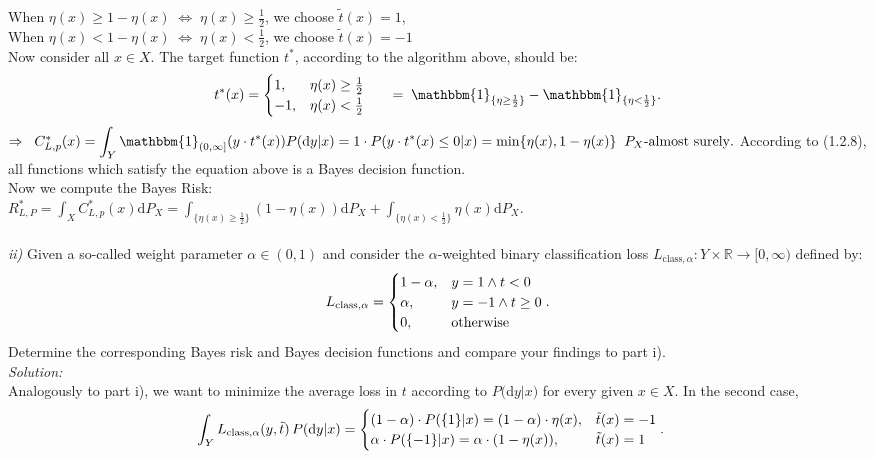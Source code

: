 \documentclass{article}
\begin{document}
When $\eta(x) \geq 1-\eta(x) \; \Leftrightarrow \; \eta(x) \geq \frac{1}{2}$, we choose $\tilde{t}(x) = 1$,\\
When $\eta(x) < 1-\eta(x) \;\Leftrightarrow\; \eta(x) < \frac{1}{2}$, we choose $\tilde{t}(x) = -1$\\
Now consider all $x\in X$. The target function $t^*$, according to the algorithm above, should be:
\begin{align*}
t^*(x) = \begin{cases} 1, &\eta(x) \geq \frac{1}{2} \cr -1, &\eta(x) < \frac{1}{2} \end{cases} 
\indent = \; \mathbbm{1}_{\{\eta \geq \frac{1}{2}\}} - \mathbbm{1}_{\{\eta < \frac{1}{2}\}}.
\end{align*}
$\Rightarrow \;\; C^*_{L,p}(x) = \displaystyle{ \int_{Y} \mathbbm{1}_{(0,\infty]}(y\cdot t^*(x)) P(\text{d}y|x)} =  1 \cdot P(y\cdot t^*(x) \leq 0 | x) = \min \{ \eta(x), 1-\eta(x) \}\;\; P_X\text{-almost surely}.$
According to (1.2.8), all functions which satisfy the equation above is a Bayes decision function.\\
Now we compute the Bayes Risk:\\
$R^*_{L,P} =  \displaystyle{ \int_{X} C^*_{L,p}(x) \text{d}P_X = \int_{\{\eta(x)\geq \frac{1}{2}\}}(1-\eta(x)) \text{d}P_X + \int_{\{\eta(x) < \frac{1}{2}\}}\eta(x) \text{d}P_X } $.\\
 \\
\textsl{ii)} Given a so-called weight parameter $\alpha \in (0,1)$ and consider the $\alpha$-weighted binary classification loss $L_{\text{class},\alpha} : Y \times \mathbb{R} \rightarrow [0,\infty)$ defined by:
\begin{align*}
L_{\text{class},\alpha} = \begin{cases} 1-\alpha, & y=1 \land t<0 \cr \alpha, & y=-1 \land t\geq 0 \cr 0, &\text{otherwise} \end{cases} .
\end{align*}
Determine the corresponding Bayes risk and Bayes decision functions and compare your findings to part i).
\vspace{0.5em}\\
\textsl{Solution:} \\
Analogously to part i), we want to minimize the average loss in $t$ according to $P($d$y|x)$ for every given $x \in X$. In the second case, 
\begin{align*}
\displaystyle{ \int_{Y} L_{\text{class},\alpha}(y,\tilde{t})\, P(\text{d}y|x) }
 & = \begin{cases} (1-\alpha)\cdot P(\{1\}|x) = (1-\alpha)\cdot \eta(x), &\tilde{t}(x) = -1 \cr  \alpha \cdot P(\{-1\}|x) = \alpha \cdot (1- \eta(x)), &\tilde{t}(x) = 1 \end{cases}.
\end{align*}
\end{document}
